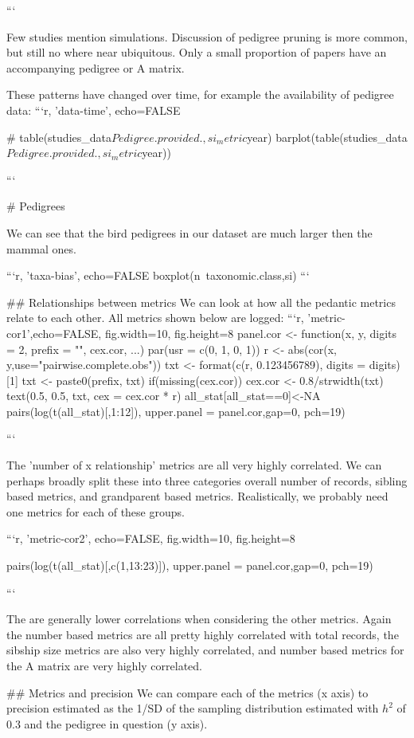 ```

Few studies mention simulations. Discussion of pedigree pruning is more common, but still no where near ubiquitous. Only a small proportion of papers have an accompanying pedigree or A matrix. 

These patterns have changed over time, for example the availability of pedigree data:
```{r, 'data-time', echo=FALSE}

# table(studies_data$Pedigree.provided.,si_metric$year)
barplot(table(studies_data$Pedigree.provided.,si_metric$year))

```



# Pedigrees

We can see that the bird pedigrees in our dataset are much larger then the mammal ones.

```{r, 'taxa-bias', echo=FALSE}
boxplot(n~taxonomic.class,si)
```


## Relationships between metrics
 We can look at how all the pedantic metrics relate to each other. All metrics shown below are logged:
```{r, 'metric-cor1',echo=FALSE, fig.width=10, fig.height=8}
panel.cor <- function(x, y, digits = 2, prefix = "", cex.cor, ...) {
   par(usr = c(0, 1, 0, 1))
   r <- abs(cor(x, y,use="pairwise.complete.obs"))
   txt <- format(c(r, 0.123456789), digits = digits)[1]
   txt <- paste0(prefix, txt)
   if(missing(cex.cor)) cex.cor <- 0.8/strwidth(txt)
   text(0.5, 0.5, txt, cex = cex.cor * r)
}
all_stat[all_stat==0]<-NA
pairs(log(t(all_stat)[,1:12]), upper.panel = panel.cor,gap=0, pch=19)

```

The 'number of x relationship' metrics are all very highly correlated. We can perhaps broadly split these into three categories overall number of records, sibling based metrics, and grandparent based metrics. Realistically, we probably need one metrics for each of these groups.

```{r, 'metric-cor2', echo=FALSE, fig.width=10, fig.height=8}

pairs(log(t(all_stat)[,c(1,13:23)]), upper.panel = panel.cor,gap=0, pch=19)

```

The are generally lower correlations when considering the other metrics. Again the number based metrics are all pretty highly correlated with total records, the sibship size metrics are also very highly correlated, and number based metrics for the A matrix are very highly correlated. 

## Metrics and precision
We can compare each of the metrics (x axis) to precision estimated as the 1/SD of the sampling distribution estimated with $h^2$ of 0.3 and the pedigree in question (y axis). 

